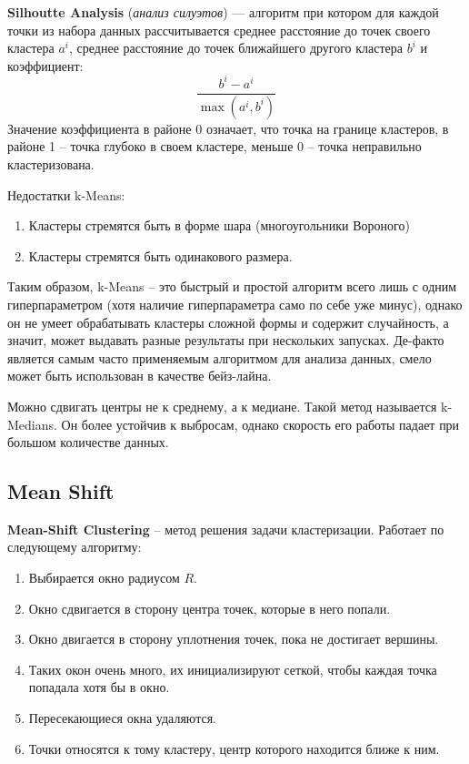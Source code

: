 \begin{definition}
    \textbf{Silhoutte Analysis} (\textit{анализ силуэтов}) --- алгоритм при котором для каждой точки из набора данных рассчитывается среднее расстояние до точек своего кластера $a^i$, среднее расстояние до точек ближайшего другого кластера $b^i$ и коэффициент:
    \[
        \dfrac{b^i-a^i}{\max(a^i,b^i)}
    \]
    Значение коэффициента в районе 0 означает, что точка на границе кластеров, в районе 1 -- точка глубоко в своем кластере, меньше 0 -- точка неправильно кластеризована.
\end{definition}

Недостатки k-Means:
\begin{enumerate}
    \item Кластеры стремятся быть в форме шара (многоугольники Вороного)
    \item Кластеры стремятся быть одинакового размера.
\end{enumerate}

Таким образом, k-Means -- это быстрый и простой алгоритм всего лишь с одним гиперпараметром (хотя наличие гиперпараметра само по себе уже минус), однако он не умеет обрабатывать кластеры сложной формы и содержит случайность, а значит, может выдавать разные результаты при нескольких запусках. Де-факто является самым часто применяемым алгоритмом для анализа данных, смело может быть использован в качестве бейз-лайна.

\begin{remark}
    Можно сдвигать центры не к среднему, а к медиане. Такой метод называется k-Medians. Он более устойчив к выбросам, однако скорость его работы падает при большом количестве данных.
\end{remark}

\subsection{Mean Shift}

\begin{definition}
    \textbf{Mean-Shift Clustering} -- метод решения задачи кластеризации. Работает по следующему алгоритму:
    \begin{enumerate}
        \item Выбирается окно радиусом $R$.
        \item Окно сдвигается в сторону центра точек, которые в него попали.
        \item Окно двигается в сторону уплотнения точек, пока не достигает вершины.
        \item Таких окон очень много, их инициализируют сеткой, чтобы каждая точка попадала хотя бы в окно.
        \item Пересекающиеся окна удаляются.
        \item Точки относятся к тому кластеру, центр которого находится ближе к ним.
    \end{enumerate}
\end{definition}


